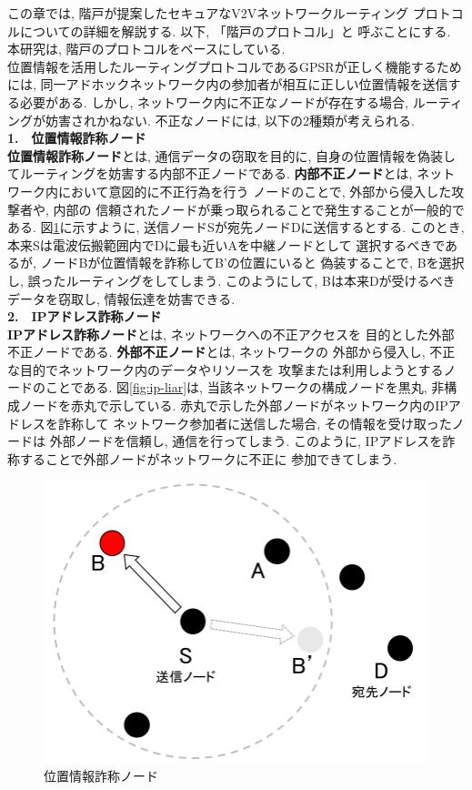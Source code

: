 この章では, 階戸\cite{shinato}が提案したセキュアなV2Vネットワークルーティング
プロトコルについての詳細を解説する. 以下, 「階戸のプロトコル」と
呼ぶことにする. 本研究は, 階戸のプロトコルをベースにしている.\\ 
\indent 位置情報を活用したルーティングプロトコルであるGPSRが正しく機能するためには, 
同一アドホックネットワーク内の参加者が相互に正しい位置情報を送信する必要がある. 
しかし, ネットワーク内に不正なノードが存在する場合, ルーティングが妨害されかねない. 
不正なノードには, 以下の2種類が考えられる. \\[0.5em]
\noindent \textbf{1.　位置情報詐称ノード}\\
\indent \textbf{位置情報詐称ノード}とは, 通信データの窃取を目的に, 
自身の位置情報を偽装してルーティングを妨害する内部不正ノードである. 
\textbf{内部不正ノード}とは, ネットワーク内において意図的に不正行為を行う
ノードのことで, 外部から侵入した攻撃者や, 内部の
信頼されたノードが乗っ取られることで発生することが一般的である. 
図\ref{fig:position-liar}に示すように, 送信ノードSが宛先ノードDに送信するとする. 
このとき, 本来Sは電波伝搬範囲内でDに最も近いAを中継ノードとして
選択するべきであるが, ノードBが位置情報を詐称してB'の位置にいると
偽装することで, Bを選択し, 誤ったルーティングをしてしまう. 
このようにして, Bは本来Dが受けるべきデータを窃取し, 
情報伝達を妨害できる.\\[0.5em]
\noindent \textbf{2.　IPアドレス詐称ノード}\\
\indent \textbf{IPアドレス詐称ノード}とは, ネットワークへの不正アクセスを
目的とした外部不正ノードである. \textbf{外部不正ノード}とは, ネットワークの
外部から侵入し, 不正な目的でネットワーク内のデータやリソースを
攻撃または利用しようとするノードのことである. 図\ref{fig:ip-liar}は,  
当該ネットワークの構成ノードを黒丸, 非構成ノードを赤丸で示している. 
赤丸で示した外部ノードがネットワーク内のIPアドレスを詐称して
ネットワーク参加者に送信した場合, その情報を受け取ったノードは
外部ノードを信頼し, 通信を行ってしまう. このように, 
IPアドレスを詐称することで外部ノードがネットワークに不正に
参加できてしまう. 
\newpage
\begin{figure}
  \centering
  \includegraphics[scale=0.6]{figures/position-liar.png}
  \caption{位置情報詐称ノード}
  \label{fig:position-liar}
\end{figure}

